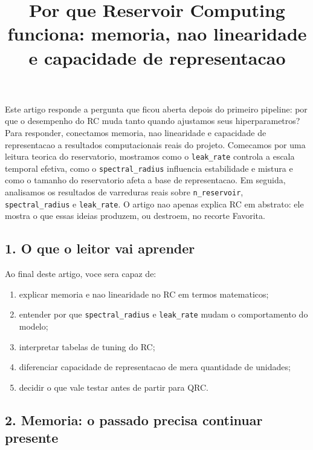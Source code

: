 \documentclass[12pt]{article}
\title{Por que Reservoir Computing funciona: memoria, nao linearidade e capacidade de representacao}
\author{}
\providecommand{\tightlist}{%
          \setlength{\itemsep}{0pt}\setlength{\parskip}{0pt}}
\begin{document}
        \maketitle

        \begin{resumo}
        Este artigo responde a pergunta que ficou aberta depois do primeiro pipeline: por que o desempenho do RC muda tanto quando ajustamos seus hiperparametros? Para responder, conectamos memoria, nao linearidade e capacidade de representacao a resultados computacionais reais do projeto. Comecamos por uma leitura teorica do reservatorio, mostramos como o \texttt{leak\_rate} controla a escala temporal efetiva, como o \texttt{spectral\_radius} influencia estabilidade e mistura e como o tamanho do reservatorio afeta a base de representacao. Em seguida, analisamos os resultados de varreduras reais sobre \texttt{n\_reservoir}, \texttt{spectral\_radius} e \texttt{leak\_rate}. O artigo nao apenas explica RC em abstrato: ele mostra o que essas ideias produzem, ou destroem, no recorte Favorita.
        \end{resumo}

        \subsection{1. O que o leitor vai aprender}\label{1-o-que-o-leitor-vai-aprender}

Ao final deste artigo, voce sera capaz de:

\begin{enumerate}
\def\labelenumi{\arabic{enumi}.}
\tightlist
\item
  explicar memoria e nao linearidade no RC em termos matematicos;
\item
  entender por que \texttt{spectral\_radius} e \texttt{leak\_rate} mudam o comportamento do modelo;
\item
  interpretar tabelas de tuning do RC;
\item
  diferenciar capacidade de representacao de mera quantidade de unidades;
\item
  decidir o que vale testar antes de partir para QRC.
\end{enumerate}

\subsection{2. Memoria: o passado precisa continuar presente}\label{2-memoria-o-passado-precisa-continuar-presente}
\end{document}
